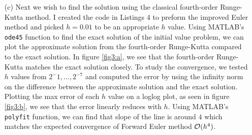 \documentclass[12pt]{report}
\begin{document}
\begin{solution}
\begin{enumerate}
        


        \item [(c)]
        Next we wish to find the solution using the classical fourth-order Runge-Kutta method. I created the code in Listings 4 to preform the improved Euler method and picked $h = 0.01$ to be an appropriate $h$ value. Using MATLAB's \verb+ode45+ function to find the exact solution of the initial value problem, we can plot the approximate solution from the fourth-order Runge-Kutta compared to the exact solution. In figure \ref{fig3:a}, we see that the fourth-order Runge-Kutta matches the exact solution closely. To study the convergence, we tested $h$ values from $2^-1,\dots,2^{-7}$ and computed the error by using the infinity norm on the difference between the approximate solution and the exact solution. Plotting the max error of each $h$ value on a loglog plot, as seen in figure \ref{fig3:b}, we see that the error linearly reduces with $h$. Using MATLAB's \verb+polyfit+ function, we can find that slope of the line is around $4$ which matches the expected convergence of Forward Euler method ${\mathcal{O}}(h^4)$.   


\end{enumerate}
\end{solution}
\end{document}
